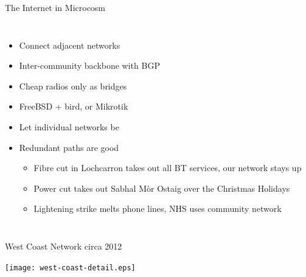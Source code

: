 \documentclass{beamer}
\begin{document}
\begin{frame}{The Internet in Microcosm}
\begin{columns}
\begin{itemize}
      \item Connect adjacent networks
      \item Inter-community backbone with BGP
      \item Cheap radios only as bridges
      \item FreeBSD + bird, or Mikrotik
      \item Let individual networks be
      \item Redundant paths are good
        \begin{itemize}
          \item Fibre cut in Lochcarron takes out all BT services, our
            network stays up
          \item Power cut takes out Sabhal M\`{o}r Ostaig over the
            Christmas Holidays
          \item Lightening strike melts phone lines, NHS uses
            community network
        \end{itemize}
    \end{itemize}
  \end{columns}
\end{frame}
\begin{frame}{West Coast Network circa 2012}
  \vspace{-2\baselineskip}
  \begin{center}
    \texttt{[image: west-coast-detail.eps]}
  \end{center}
\end{frame}
\end{document}
